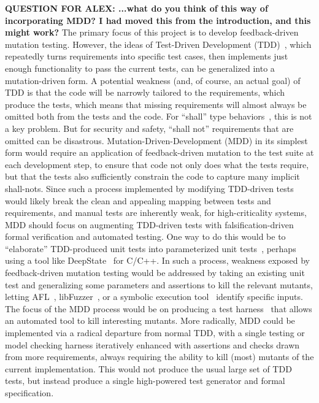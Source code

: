 \textbf{QUESTION FOR ALEX: ...what do you think of this way of incorporating
  MDD? I had moved this from the introduction, and this might work?}
The primary focus of this project is to develop feedback-driven mutation
testing.  However, the ideas of Test-Driven Development
(TDD)~\cite{TDD,TDDFuture}, which repeatedly turns requirements into specific
test cases, then implements just enough functionality to pass the current tests,
can be generalized into a mutation-driven form.  A potential weakness (and, of
course, an actual goal) of TDD is that the code will be narrowly tailored to the
requirements, which produce the tests, which means that missing requirements
will almost always be omitted both from the tests and the code.  For ``shall''
type behaviors~\cite{INCOSE}, this is not a key problem.  But for security and
safety, ``shall not'' requirements that are omitted can be disastrous.
Mutation-Driven-Development (MDD) in its simplest form would require an
application of feedback-driven mutation to the test suite at each development
step, to ensure that code not only does what the tests require, but that the
tests also sufficiently constrain the code to capture many implicit shall-nots.
Since such a process implemented by modifying TDD-driven tests would likely
break the clean and appealing mapping between tests and requirements, and manual
tests are inherently weak, for high-criticality systems, MDD should focus on
augmenting TDD-driven tests with falsification-driven formal verification and
automated testing.  One way to do this would be to ``elaborate'' TDD-produced
unit tests into parameterized unit tests~\cite{UnitMeister,ParamUnit}, perhaps
using a tool like DeepState~\cite{DeepState} for C/C++.  In such a process,
weakness exposed by feedback-driven mutation testing would be addressed by
taking an existing unit test and generalizing some parameters and assertions to
kill the relevant mutants, letting AFL~\cite{aflfuzz},
libFuzzer~\cite{libfuzzer}, or a symbolic execution
tool~\cite{angr1,angr2,manticore} identify specific inputs.  The focus of the
MDD process would be on producing a test harness~\cite{WODACommon,tstlsttt} that
allows an automated tool to kill interesting mutants.  More radically, MDD could
be implemented via a radical departure from normal TDD, with a single testing or
model checking harness iteratively enhanced with assertions and checks drawn
from more requirements, always requiring the ability to kill (most) mutants of
the current implementation.  This would not produce the usual large set of TDD
tests, but instead produce a single high-powered test generator and formal
specification.

